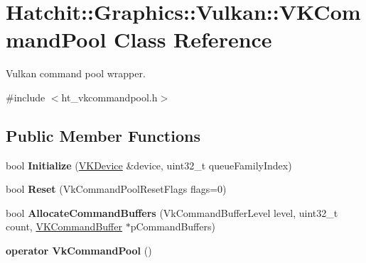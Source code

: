 \hypertarget{classHatchit_1_1Graphics_1_1Vulkan_1_1VKCommandPool}{}\section{Hatchit\+:\+:Graphics\+:\+:Vulkan\+:\+:V\+K\+Command\+Pool Class Reference}
\label{classHatchit_1_1Graphics_1_1Vulkan_1_1VKCommandPool}


Vulkan command pool wrapper.  




{\ttfamily \#include $<$ht\+\_\+vkcommandpool.\+h$>$}

\subsection*{Public Member Functions}
\begin{DoxyCompactItemize}
\item 
bool {\bfseries Initialize} (\hyperlink{classHatchit_1_1Graphics_1_1Vulkan_1_1VKDevice}{V\+K\+Device} \&device, uint32\+\_\+t queue\+Family\+Index)\hypertarget{classHatchit_1_1Graphics_1_1Vulkan_1_1VKCommandPool_a3746f494bb1013b4c9112c55f8333438}{}\label{classHatchit_1_1Graphics_1_1Vulkan_1_1VKCommandPool_a3746f494bb1013b4c9112c55f8333438}

\item 
bool {\bfseries Reset} (Vk\+Command\+Pool\+Reset\+Flags flags=0)\hypertarget{classHatchit_1_1Graphics_1_1Vulkan_1_1VKCommandPool_af632dcf6ee84fe43c0f077580852925a}{}\label{classHatchit_1_1Graphics_1_1Vulkan_1_1VKCommandPool_af632dcf6ee84fe43c0f077580852925a}

\item 
bool {\bfseries Allocate\+Command\+Buffers} (Vk\+Command\+Buffer\+Level level, uint32\+\_\+t count, \hyperlink{classHatchit_1_1Graphics_1_1Vulkan_1_1VKCommandBuffer}{V\+K\+Command\+Buffer} $\ast$p\+Command\+Buffers)\hypertarget{classHatchit_1_1Graphics_1_1Vulkan_1_1VKCommandPool_ab72eb0736d8baca00c9624e9d803229e}{}\label{classHatchit_1_1Graphics_1_1Vulkan_1_1VKCommandPool_ab72eb0736d8baca00c9624e9d803229e}

\item 
{\bfseries operator Vk\+Command\+Pool} ()\hypertarget{classHatchit_1_1Graphics_1_1Vulkan_1_1VKCommandPool_aee7ae01983e2b99765532e8867363149}{}\label{classHatchit_1_1Graphics_1_1Vulkan_1_1VKCommandPool_aee7ae01983e2b99765532e8867363149}

\end{DoxyCompactItemize}


